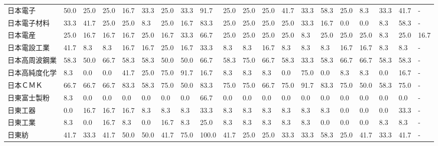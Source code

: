 \begin{tabular}{llllllllllllllllllll}
日本電子            &   50.0 &   25.0 &      25.0 &      16.7 &       33.3 &   25.0 &   33.3 &   91.7 &    25.0 &    25.0 &   25.0 &  41.7 &   33.3 &    58.3 &    25.0 &   8.3 &  33.3 &  41.7 &     - \\
日本電子材料          &   33.3 &   41.7 &      25.0 &      25.0 &        8.3 &   25.0 &   16.7 &   83.3 &    25.0 &    25.0 &   25.0 &  25.0 &   33.3 &    16.7 &     0.0 &   0.0 &   8.3 &  58.3 &     - \\
日本電産            &   25.0 &   16.7 &      16.7 &      16.7 &       25.0 &   16.7 &   33.3 &   66.7 &    25.0 &    25.0 &   25.0 &  25.0 &    8.3 &    25.0 &    25.0 &  25.0 &   8.3 &  25.0 &  16.7 \\
日本電設工業          &   41.7 &    8.3 &       8.3 &      16.7 &       16.7 &   25.0 &   16.7 &   33.3 &     8.3 &     8.3 &   16.7 &   8.3 &    8.3 &     8.3 &    16.7 &  16.7 &   8.3 &   8.3 &     - \\
日本高周波鋼業         &   58.3 &   50.0 &      66.7 &      58.3 &       58.3 &   50.0 &   50.0 &   66.7 &    58.3 &    75.0 &   66.7 &  58.3 &   33.3 &    58.3 &    66.7 &  66.7 &  58.3 &  58.3 &     - \\
日本高純度化学         &    8.3 &    0.0 &       0.0 &      41.7 &       25.0 &   75.0 &   91.7 &   16.7 &     8.3 &     8.3 &    8.3 &   0.0 &   75.0 &     0.0 &     8.3 &   8.3 &   0.0 &  16.7 &     - \\
日本ＣＭＫ           &   66.7 &   66.7 &      66.7 &      83.3 &       58.3 &   75.0 &   50.0 &   83.3 &    75.0 &    75.0 &   66.7 &  75.0 &   91.7 &    83.3 &    75.0 &  50.0 &  58.3 &  75.0 &     - \\
日東富士製粉          &    8.3 &    0.0 &       0.0 &       0.0 &        0.0 &    0.0 &    0.0 &   66.7 &     0.0 &     0.0 &    0.0 &   0.0 &    0.0 &     0.0 &     0.0 &   0.0 &   0.0 &   0.0 &     - \\
日東工器            &    0.0 &   16.7 &      16.7 &      16.7 &        8.3 &    8.3 &    8.3 &   33.3 &     8.3 &     8.3 &    8.3 &   8.3 &    8.3 &     8.3 &     0.0 &   0.0 &   0.0 &  33.3 &     - \\
日東工業            &    8.3 &    0.0 &      16.7 &       8.3 &        0.0 &   16.7 &    8.3 &   25.0 &     8.3 &     8.3 &    8.3 &   8.3 &    8.3 &     0.0 &     0.0 &   0.0 &   8.3 &   8.3 &     - \\
日東紡             &   41.7 &   33.3 &      41.7 &      50.0 &       50.0 &   41.7 &   75.0 &  100.0 &    41.7 &    25.0 &   25.0 &  33.3 &   33.3 &    58.3 &    25.0 &  41.7 &  33.3 &  41.7 &     - \\

\end{tabular}
